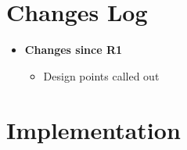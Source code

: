 \documentclass[a4paper,10pt,oneside,openany,final,article]{memoir}
\begin{document}
\chapter*{Changes Log}

\begin{itemize}
\item \textbf{Changes since R1}
  \begin{itemize}
  \item Design points called out
  \end{itemize}
\end{itemize}

\backmatter
\chapter*{Implementation}
\end{document}
